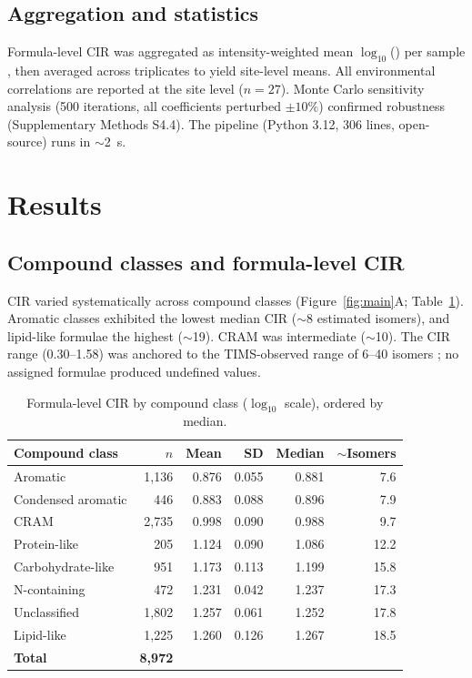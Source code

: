 \documentclass[12pt,letterpaper]{article}
\begin{document}
\subsection{Aggregation and statistics}

Formula-level CIR was aggregated as intensity-weighted mean $\log_{10}$() per sample \citep{tfaily2015}, then averaged across triplicates to yield site-level means. All environmental correlations are reported at the site level ($n = 27$). Monte Carlo sensitivity analysis (500 iterations, all coefficients perturbed $\pm 10\%$) confirmed robustness (Supplementary Methods S4.4). The pipeline (Python 3.12, 306 lines, open-source) runs in $\sim$2~s.

\section{Results}

\subsection{Compound classes and formula-level CIR}

CIR varied systematically across compound classes (Figure~\ref{fig:main}A; Table~\ref{tab:classes}). Aromatic classes exhibited the lowest median CIR ($\sim$8 estimated isomers), and lipid-like formulae the highest ($\sim$19). CRAM was intermediate ($\sim$10). The CIR range (0.30--1.58) was anchored to the TIMS-observed range of 6--40 isomers \citep{leyva2019}; no assigned formulae produced undefined values.

\begin{table}[ht]
\centering
\caption{Formula-level CIR by compound class ($\log_{10}$ scale), ordered by median.}
\label{tab:classes}
\begin{tabular}{lrrrrr}
\toprule
Compound class & $n$ & Mean & SD & Median & $\sim$Isomers \\
\midrule
Aromatic & 1,136 & 0.876 & 0.055 & 0.881 & 7.6 \\
Condensed aromatic & 446 & 0.883 & 0.088 & 0.896 & 7.9 \\
CRAM & 2,735 & 0.998 & 0.090 & 0.988 & 9.7 \\
Protein-like & 205 & 1.124 & 0.090 & 1.086 & 12.2 \\
Carbohydrate-like & 951 & 1.173 & 0.113 & 1.199 & 15.8 \\
N-containing & 472 & 1.231 & 0.042 & 1.237 & 17.3 \\
Unclassified & 1,802 & 1.257 & 0.061 & 1.252 & 17.8 \\
Lipid-like & 1,225 & 1.260 & 0.126 & 1.267 & 18.5 \\
\midrule
\textbf{Total} & \textbf{8,972} & & & & \\
\bottomrule
\end{tabular}
\end{table}
\end{document}
